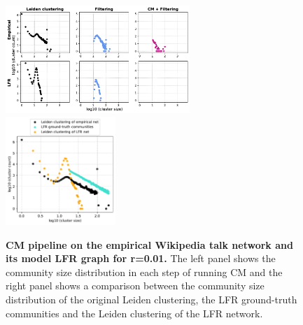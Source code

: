 \documentclass[a4paper]{article}   	%
\begin{document}
\begin{figure}[h!]
\centering
\includegraphics[width=0.62\textwidth]{figs/wiki_talk_cm_steps_lfr01.pdf}
\includegraphics[width=0.37\textwidth]{figs/wiki_talk_01_cm_size.pdf}
\caption[CM pipeline on the Wikipedia talk network and its model LFR graph for r=0.01]{\textbf{CM pipeline on the empirical Wikipedia talk network and its model LFR graph for r=0.01.} The left panel shows the community size distribution in each step of running CM and the right panel shows a comparison between the community size distribution of the original Leiden clustering, the LFR ground-truth communities and the Leiden clustering of the LFR network.}
\label{fig:wikitalk-cm-lfr-01}
\end{figure}
\end{document}
